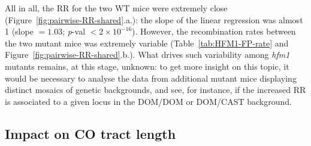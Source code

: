 All in all, the RR for the two WT mice were extremely close (Figure~\ref{fig:pairwise-RR-shared}.a.): the slope of the linear regression was almost 1 (slope $=1.03$; \textit{p}-val $<2 \times 10^{-16}$).
However, the recombination rates between the two mutant mice was extremely variable (Table~\ref{tab:HFM1-FP-rate} and Figure~\ref{fig:pairwise-RR-shared}.b.).
What drives such variability among \textit{hfm1} mutants remains, at this stage, unknown: to get more insight on this topic, it would be necessary to analyse the data from additional mutant mice displaying distinct mosaics of genetic backgrounds, and see, for instance, if the increased RR is associated to a given locus in the DOM/DOM or DOM/CAST background.


\subsection{Impact on CO tract length}



